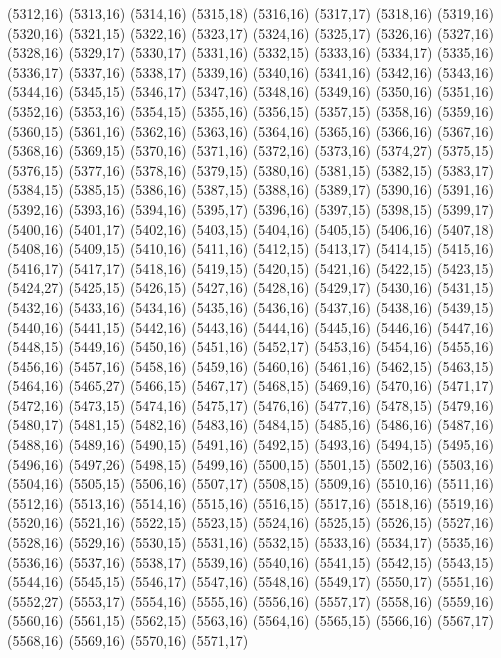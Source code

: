 (5312,16)
(5313,16)
(5314,16)
(5315,18)
(5316,16)
(5317,17)
(5318,16)
(5319,16)
(5320,16)
(5321,15)
(5322,16)
(5323,17)
(5324,16)
(5325,17)
(5326,16)
(5327,16)
(5328,16)
(5329,17)
(5330,17)
(5331,16)
(5332,15)
(5333,16)
(5334,17)
(5335,16)
(5336,17)
(5337,16)
(5338,17)
(5339,16)
(5340,16)
(5341,16)
(5342,16)
(5343,16)
(5344,16)
(5345,15)
(5346,17)
(5347,16)
(5348,16)
(5349,16)
(5350,16)
(5351,16)
(5352,16)
(5353,16)
(5354,15)
(5355,16)
(5356,15)
(5357,15)
(5358,16)
(5359,16)
(5360,15)
(5361,16)
(5362,16)
(5363,16)
(5364,16)
(5365,16)
(5366,16)
(5367,16)
(5368,16)
(5369,15)
(5370,16)
(5371,16)
(5372,16)
(5373,16)
(5374,27)
(5375,15)
(5376,15)
(5377,16)
(5378,16)
(5379,15)
(5380,16)
(5381,15)
(5382,15)
(5383,17)
(5384,15)
(5385,15)
(5386,16)
(5387,15)
(5388,16)
(5389,17)
(5390,16)
(5391,16)
(5392,16)
(5393,16)
(5394,16)
(5395,17)
(5396,16)
(5397,15)
(5398,15)
(5399,17)
(5400,16)
(5401,17)
(5402,16)
(5403,15)
(5404,16)
(5405,15)
(5406,16)
(5407,18)
(5408,16)
(5409,15)
(5410,16)
(5411,16)
(5412,15)
(5413,17)
(5414,15)
(5415,16)
(5416,17)
(5417,17)
(5418,16)
(5419,15)
(5420,15)
(5421,16)
(5422,15)
(5423,15)
(5424,27)
(5425,15)
(5426,15)
(5427,16)
(5428,16)
(5429,17)
(5430,16)
(5431,15)
(5432,16)
(5433,16)
(5434,16)
(5435,16)
(5436,16)
(5437,16)
(5438,16)
(5439,15)
(5440,16)
(5441,15)
(5442,16)
(5443,16)
(5444,16)
(5445,16)
(5446,16)
(5447,16)
(5448,15)
(5449,16)
(5450,16)
(5451,16)
(5452,17)
(5453,16)
(5454,16)
(5455,16)
(5456,16)
(5457,16)
(5458,16)
(5459,16)
(5460,16)
(5461,16)
(5462,15)
(5463,15)
(5464,16)
(5465,27)
(5466,15)
(5467,17)
(5468,15)
(5469,16)
(5470,16)
(5471,17)
(5472,16)
(5473,15)
(5474,16)
(5475,17)
(5476,16)
(5477,16)
(5478,15)
(5479,16)
(5480,17)
(5481,15)
(5482,16)
(5483,16)
(5484,15)
(5485,16)
(5486,16)
(5487,16)
(5488,16)
(5489,16)
(5490,15)
(5491,16)
(5492,15)
(5493,16)
(5494,15)
(5495,16)
(5496,16)
(5497,26)
(5498,15)
(5499,16)
(5500,15)
(5501,15)
(5502,16)
(5503,16)
(5504,16)
(5505,15)
(5506,16)
(5507,17)
(5508,15)
(5509,16)
(5510,16)
(5511,16)
(5512,16)
(5513,16)
(5514,16)
(5515,16)
(5516,15)
(5517,16)
(5518,16)
(5519,16)
(5520,16)
(5521,16)
(5522,15)
(5523,15)
(5524,16)
(5525,15)
(5526,15)
(5527,16)
(5528,16)
(5529,16)
(5530,15)
(5531,16)
(5532,15)
(5533,16)
(5534,17)
(5535,16)
(5536,16)
(5537,16)
(5538,17)
(5539,16)
(5540,16)
(5541,15)
(5542,15)
(5543,15)
(5544,16)
(5545,15)
(5546,17)
(5547,16)
(5548,16)
(5549,17)
(5550,17)
(5551,16)
(5552,27)
(5553,17)
(5554,16)
(5555,16)
(5556,16)
(5557,17)
(5558,16)
(5559,16)
(5560,16)
(5561,15)
(5562,15)
(5563,16)
(5564,16)
(5565,15)
(5566,16)
(5567,17)
(5568,16)
(5569,16)
(5570,16)
(5571,17)
